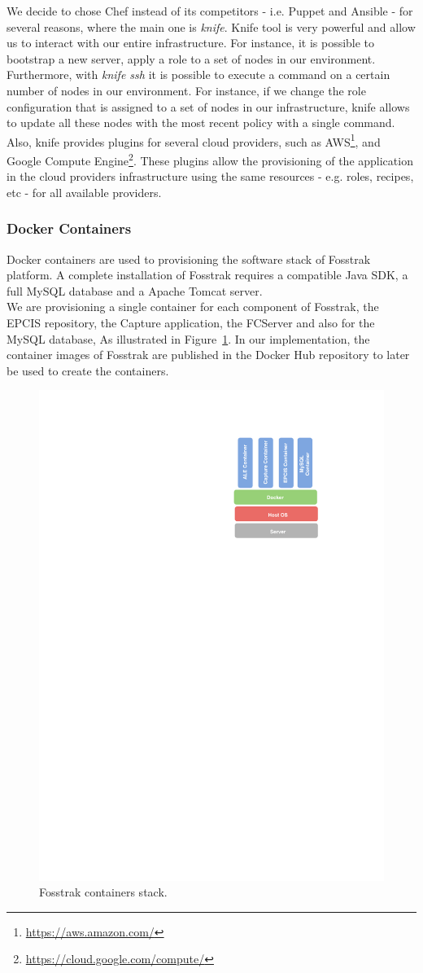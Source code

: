 We decide to chose Chef instead of its competitors - i.e. Puppet and Ansible - for several
reasons, where the main one is \textit{knife}. Knife tool is very powerful and allow us to
interact with our entire infrastructure. For instance, it is possible to bootstrap a new server,
apply a role to a set of nodes in our environment. Furthermore, with \textit{knife ssh} it is possible
to execute a command on a certain number of nodes in our environment. For instance, if we change
the role configuration that is assigned to a set of nodes in our infrastructure, knife allows to
update all these nodes with the most recent policy with a single command.\\

Also, knife provides plugins for several cloud providers, such as \gls{AWS}\footnote{\url{https://aws.amazon.com/}},
and Google Compute Engine\footnote{\url{https://cloud.google.com/compute/}}. These plugins allow
the provisioning of the application in the cloud providers infrastructure using the same resources - e.g.
roles, recipes, etc - for all available providers.

\subsubsection{Docker Containers}
\label{subs:impl_docker}
Docker containers are used to provisioning the software stack of Fosstrak platform. A complete
installation of Fosstrak requires a compatible Java \gls{SDK}, a full MySQL database and a Apache Tomcat
server.\\

We are provisioning a single container for each component of Fosstrak, the \gls{EPCIS} repository,
the Capture application, the \gls{FCServer} and also for the MySQL database, As illustrated in Figure~\ref{fig:impl_containers}.
In our implementation, the container images of Fosstrak are published in the Docker Hub repository
to later be used to create the containers.\\

\begin{figure}[!ht]
\centering
\includegraphics[width=.3\textwidth]{./images/docker-stack}
\caption[Fosstrak containers stack.]{Fosstrak containers stack.}
\label{fig:impl_containers}
\end{figure}

